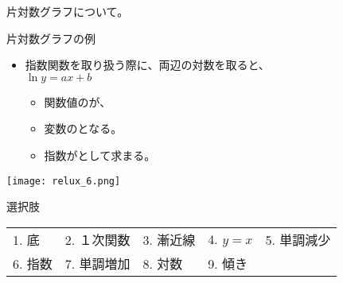 \documentclass[uplatex,dvipdfmx,a4paper,11pt]{jsarticle}
\begin{document}
\begin{qlist}
\begin{qlist2}
			\qitem 片対数グラフについて。
			\begin{center}
				\begin{minipage}{0.42\textwidth}
					\begin{itembox}[l]{片対数グラフの例}
						\begin{itemize}
							\item 指数関数を取り扱う際に、両辺の対数を取ると、\\
							$\ln y = ax + b$
							\begin{itemize}
								\item 関数値の\qbox{}が、
								\item 変数の\qbox{}となる。
								\item 指数が\qbox{}として求まる。
							\end{itemize}
						\end{itemize}
					\end{itembox}
				\end{minipage}
				\begin{minipage}{0.42\textwidth}
					\begin{center}
					\texttt{[image: relux\_6.png]}
					\end{center}
				\end{minipage}
			\end{center}
		\end{qlist2}

		\begin{itembox}[l]{選択肢}
			\begin{center}
				\begin{tabular}{lllll}
					1. 底	&2. １次関数	&3. 漸近線	&4. $y=x$	&5. 単調減少\\
					6. 指数	&7. 単調増加		&8. 対数				&9. 傾き
				\end{tabular}
			\end{center}
		\end{itembox}
\end{qlist}
\end{document}
